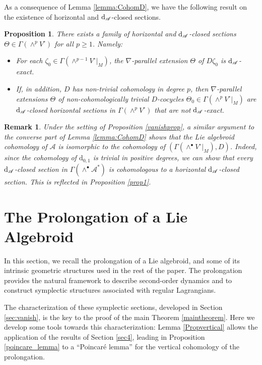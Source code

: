 \documentclass[12pt,letterpaper]{article}
\newcommand{\A}{\mathscr{A}}
\let\oldd\d
\renewcommand{\d}{%
  \relax\ifmmode\mathrm{d}\else\oldd\fi
}
\newcommand{\dv}{\mathrm{d}_{0,1}}
\newtheorem{remark}[theorem]{Remark}
\newtheorem{proposition}[theorem]{Proposition}
\numberwithin{equation}{section}
\begin{document}
As a consequence of Lemma \ref{lemma:CohomD}, we have the following result on the existence of horizontal and $\d_\A$-closed sections.

\begin{proposition}\label{prop:ExistHor}
  There exists a family of horizontal and $\d_\A$-closed sections $\Theta\in\Gamma(\wedge^pV^\circ)$ for all $p\geq1$. Namely:
  \begin{itemize}
    \item For each $\zeta_0\in\Gamma(\wedge^{p-1}V^\circ|_M)$, the $\nabla$-parallel extension $\Theta$ of $D\zeta_0$ is $\d_\A$-exact.
    \item If, in addition, $D$ has non-trivial cohomology in degree $p$, then 
          $\nabla$-parallel extensions $\Theta$ of non-cohomologically trivial $D$-cocycles $\Theta_0\in\Gamma(\wedge^pV^\circ|_M)$ are
          $\d_\A$-closed horizontal sections in $\Gamma(\wedge^pV^\circ)$ that are not $\d_\A$-exact.
  \end{itemize}
\end{proposition}

\begin{remark}
  Under the setting of Proposition \ref{vanishprop}, a similar argument to the converse part of Lemma \ref{lemma:CohomD} shows that
  the Lie algebroid cohomology of $\A$ is isomorphic to the cohomology of $(\Gamma(\wedge^\bullet V^\circ|_M),D)$.
  Indeed, since the cohomology of $\dv$ is trivial in positive degrees, 
  we can show that every $\d_\A$-closed section in $\Gamma(\wedge^\bullet\A^*)$ is cohomologous to a horizontal $\d_\A$-closed section.
  This is reflected in Proposition \ref{prop1}.
\end{remark}
\fi


\section{The Prolongation of a Lie Algebroid}\label{sec:Prol}

In this section, we recall the prolongation of a Lie algebroid,
and some of its intrinsic geometric structures used in the rest of the paper.
The prolongation provides the natural framework to describe second-order dynamics 
and to construct symplectic structures associated with regular Lagrangians.

The characterization of these symplectic sections, developed in Section \ref{sec:vanish},
is the key to the proof of the main Theorem \ref{maintheorem}.
Here we develop some tools towards this characterization:
Lemma \ref{Propvertical} allows the application of the results of Section \ref{sec4},
leading in Proposition \ref{poincare_lemma} to a ``Poincaré lemma'' for the vertical cohomology of the prolongation.
\end{document}
